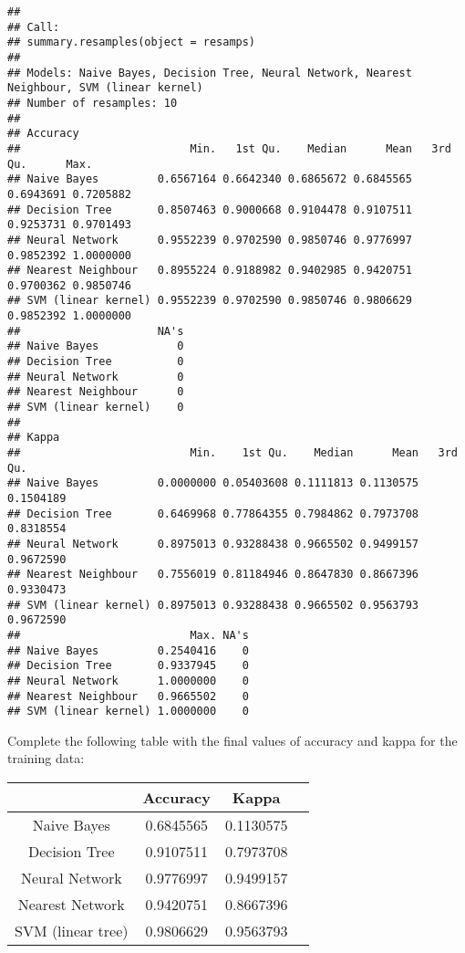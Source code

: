 \documentclass[]{article}
\begin{document}
\begin{verbatim}
## 
## Call:
## summary.resamples(object = resamps)
## 
## Models: Naive Bayes, Decision Tree, Neural Network, Nearest Neighbour, SVM (linear kernel) 
## Number of resamples: 10 
## 
## Accuracy 
##                          Min.   1st Qu.    Median      Mean   3rd Qu.      Max.
## Naive Bayes         0.6567164 0.6642340 0.6865672 0.6845565 0.6943691 0.7205882
## Decision Tree       0.8507463 0.9000668 0.9104478 0.9107511 0.9253731 0.9701493
## Neural Network      0.9552239 0.9702590 0.9850746 0.9776997 0.9852392 1.0000000
## Nearest Neighbour   0.8955224 0.9188982 0.9402985 0.9420751 0.9700362 0.9850746
## SVM (linear kernel) 0.9552239 0.9702590 0.9850746 0.9806629 0.9852392 1.0000000
##                     NA's
## Naive Bayes            0
## Decision Tree          0
## Neural Network         0
## Nearest Neighbour      0
## SVM (linear kernel)    0
## 
## Kappa 
##                          Min.    1st Qu.    Median      Mean   3rd Qu.
## Naive Bayes         0.0000000 0.05403608 0.1111813 0.1130575 0.1504189
## Decision Tree       0.6469968 0.77864355 0.7984862 0.7973708 0.8318554
## Neural Network      0.8975013 0.93288438 0.9665502 0.9499157 0.9672590
## Nearest Neighbour   0.7556019 0.81184946 0.8647830 0.8667396 0.9330473
## SVM (linear kernel) 0.8975013 0.93288438 0.9665502 0.9563793 0.9672590
##                          Max. NA's
## Naive Bayes         0.2540416    0
## Decision Tree       0.9337945    0
## Neural Network      1.0000000    0
## Nearest Neighbour   0.9665502    0
## SVM (linear kernel) 1.0000000    0
\end{verbatim}

Complete the following table with the final values of accuracy and kappa
for the training data:

\begin{center}
	\begin{tabular}{ |c|c|c|c| } 
		\hline
		& Accuracy & Kappa \\
		\hline
		Naive Bayes & 0.6845565 & 0.1130575 \\ 
		Decision Tree & 0.9107511 & 0.7973708 \\ 
		Neural Network & 0.9776997 & 0.9499157 \\
		Nearest Network & 0.9420751 & 0.8667396 \\
		SVM (linear tree) & 0.9806629 & 0.9563793 \\
		\hline
	\end{tabular}
\end{center}
\end{document}
